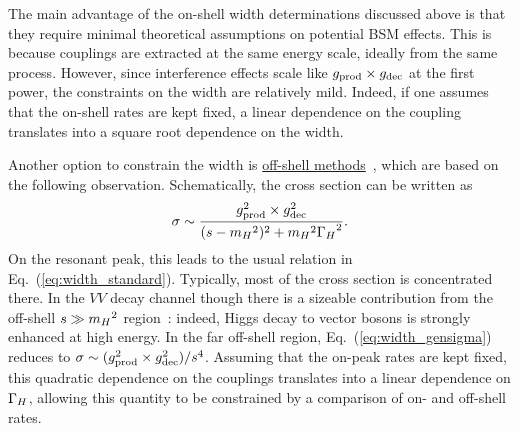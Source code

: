 The main advantage of the on-shell width determinations discussed above is that they require minimal theoretical assumptions on potential
BSM effects. This is because couplings are extracted at the same energy scale, ideally
from the same process. However, since interference effects scale like 
$g_{\rm prod}\times g_{\rm dec}$ at the first power, the constraints on the width are relatively mild.
Indeed, if one assumes that the on-shell rates are kept fixed, a linear dependence on the coupling 
translates into a square root dependence on the width. 

Another option to constrain the width is 
\underline{off-shell methods}~\cite{Kauer:2012hd,Caola:2013yja,Campbell:2013una,Campbell:2013wga}, 
which are based on the following observation.
Schematically, the cross section can be written as
\begin{equation}
\sigma \sim \frac{g_{\rm prod}^2 \times g_{\rm dec}^2}{(s-{m_H}^2)^2 + {m_H}^2 {\Gamma_H}^2}.
\label{eq:width_gensigma}
\end{equation}
On the resonant peak, this leads to the usual relation in Eq.~(\ref{eq:width_standard}). Typically,
most of the cross section is concentrated there. In the $VV$ decay channel though there is a sizeable
contribution from the off-shell $s \gg {m_H}^2$ region~\cite{Kauer:2012hd}: 
indeed, Higgs decay to vector bosons is 
strongly enhanced at high energy. In the far
off-shell region, Eq.~(\ref{eq:width_gensigma}) reduces to 
$\sigma\sim (g_{\rm prod}^2\times g_{\rm dec}^2)/s^4$. Assuming that the on-peak rates are kept
fixed, this quadratic dependence on the couplings translates into a linear dependence on ${\Gamma_H}$, allowing this quantity
to be constrained by a comparison of on- and off-shell rates. 

